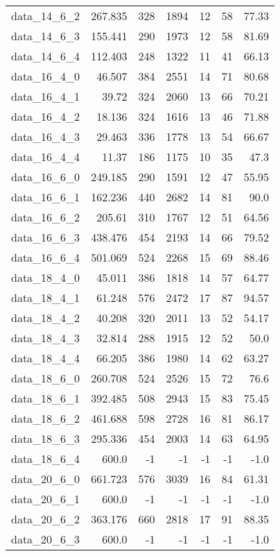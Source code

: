 \begin{tabular}{rrrrrrr}
  data\_14\_6\_2 & 267.835 & 328 & 1894 & 12 & 58 & 77.33 \\
  data\_14\_6\_3 & 155.441 & 290 & 1973 & 12 & 58 & 81.69 \\
  data\_14\_6\_4 & 112.403 & 248 & 1322 & 11 & 41 & 66.13 \\
  data\_16\_4\_0 & 46.507 & 384 & 2551 & 14 & 71 & 80.68 \\
  data\_16\_4\_1 & 39.72 & 324 & 2060 & 13 & 66 & 70.21 \\
  data\_16\_4\_2 & 18.136 & 324 & 1616 & 13 & 46 & 71.88 \\
  data\_16\_4\_3 & 29.463 & 336 & 1778 & 13 & 54 & 66.67 \\
  data\_16\_4\_4 & 11.37 & 186 & 1175 & 10 & 35 & 47.3 \\
  data\_16\_6\_0 & 249.185 & 290 & 1591 & 12 & 47 & 55.95 \\
  data\_16\_6\_1 & 162.236 & 440 & 2682 & 14 & 81 & 90.0 \\
  data\_16\_6\_2 & 205.61 & 310 & 1767 & 12 & 51 & 64.56 \\
  data\_16\_6\_3 & 438.476 & 454 & 2193 & 14 & 66 & 79.52 \\
  data\_16\_6\_4 & 501.069 & 524 & 2268 & 15 & 69 & 88.46 \\
  data\_18\_4\_0 & 45.011 & 386 & 1818 & 14 & 57 & 64.77 \\
  data\_18\_4\_1 & 61.248 & 576 & 2472 & 17 & 87 & 94.57 \\
  data\_18\_4\_2 & 40.208 & 320 & 2011 & 13 & 52 & 54.17 \\
  data\_18\_4\_3 & 32.814 & 288 & 1915 & 12 & 52 & 50.0 \\
  data\_18\_4\_4 & 66.205 & 386 & 1980 & 14 & 62 & 63.27 \\
  data\_18\_6\_0 & 260.708 & 524 & 2526 & 15 & 72 & 76.6 \\
  data\_18\_6\_1 & 392.485 & 508 & 2943 & 15 & 83 & 75.45 \\
  data\_18\_6\_2 & 461.688 & 598 & 2728 & 16 & 81 & 86.17 \\
  data\_18\_6\_3 & 295.336 & 454 & 2003 & 14 & 63 & 64.95 \\
  data\_18\_6\_4 & 600.0 & -1 & -1 & -1 & -1 & -1.0 \\
  data\_20\_6\_0 & 661.723 & 576 & 3039 & 16 & 84 & 61.31 \\
  data\_20\_6\_1 & 600.0 & -1 & -1 & -1 & -1 & -1.0 \\
  data\_20\_6\_2 & 363.176 & 660 & 2818 & 17 & 91 & 88.35 \\
  data\_20\_6\_3 & 600.0 & -1 & -1 & -1 & -1 & -1.0 \\

\end{tabular}
